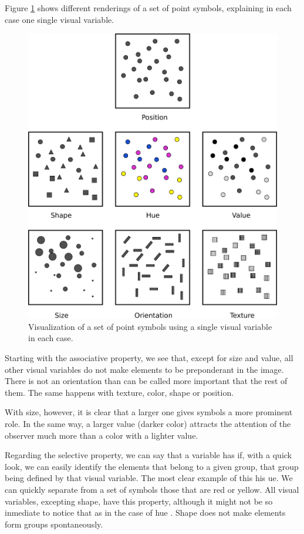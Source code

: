 Figure \ref{Fig:PropertiesVisualVariables} shows different renderings of a set of point symbols, explaining in each case one single visual variable.

\begin{figure}[!hbt]
\centering
\includegraphics[width=\columnwidth]{Visualization/PropertiesVisualVariables.pdf}
\caption{\small Visualization of a set of point symbols using a single visual variable in each case.}
\label{Fig:PropertiesVisualVariables} 
\end{figure}

Starting with the associative property, we see that, except for size and value, all other visual variables do not make elements to be preponderant in the image. There is not an orientation than can be called more important that the rest of them. The same happens with texture, color, shape or position.

With size, however, it is clear that a larger one gives symbols a more prominent role. In the same way, a larger value (darker color) attracts the attention of the observer much more than a color with a lighter value.

Regarding the selective property, we can say that a variable has if, with a quick look, we can easily identify the elements that belong to a given group, that group being defined by that visual variable. The most clear example of this his ue. We can quickly separate from a set of symbols those that are red or yellow. All visual variables, excepting shape, have this property, although it might not be so inmediate to notice that as in the case of hue . Shape does not make elements form groups spontaneously.


